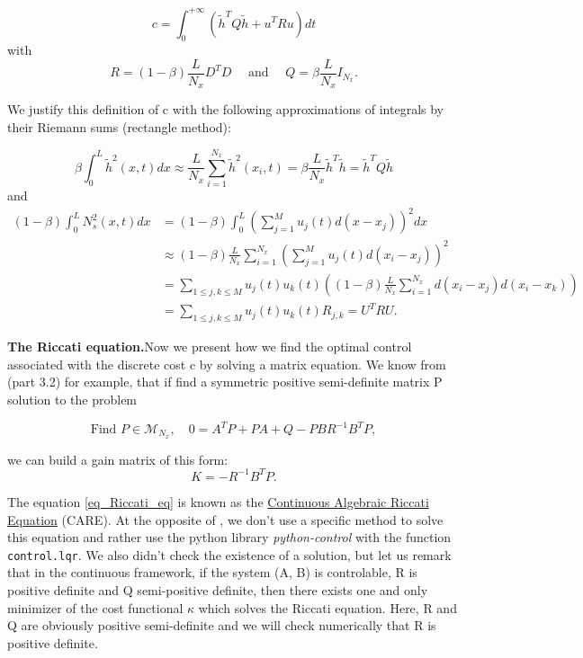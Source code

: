 \documentclass[12pt]{article}
\begin{document}
\begin{equation}\label{eq_LQR_discrete_cost}
\boxed{
    c = \int_0^{+\infty}(\tilde{h}^TQ\tilde{h}+u^TRu)dt}
\end{equation}
with 
\begin{equation}\label{eq_LQR_discrete_cost_matrices}
   R=(1-\beta)\frac{L}{N_x}D^TD\quad \text{ and } \quad  Q=\beta \frac{L}{N_x}I_{N_x}.
\end{equation}

We justify this definition of c with the following approximations of integrals by their Riemann sums (rectangle method):

$$\beta\int_0^L\tilde{h}^2(x,t)dx \boxed{\approx} \frac{L}{N_x}\sum_{i=1}^{N_x}\tilde{h}^2(x_i,t) = \beta\frac{L}{N_x}\tilde{h}^T\tilde{h}=\tilde{h}^TQ\tilde{h}$$
and 
\begin{align*} (1-\beta)\int_0^L N_s^2(x, t)dx &= (1-\beta)\int_0^L(\sum_{j=1}^{M}u_j(t)d(x-x_j))^2dx \\ &\boxed{\approx} (1-\beta)\frac{L}{N_x}\sum_{i=1}^{N_x}(\sum_{j=1}^{M}u_j(t)d(x_i-x_j))^2 \\&= \sum_{1\leq j, k\leq M}u_j(t)u_k(t)((1-\beta)\frac{L}{N_x}\sum_{i=1}^{N_x}d(x_i-x_j)d(x_i-x_k)) \\ &= \sum_{1\leq j, k\leq M}u_j(t)u_k(t) R_{j,k} = U^TRU.\end{align*}



\textbf{The Riccati equation.}Now we present how we find the optimal control associated with the discrete cost c by solving a matrix equation. We know from \cite{A_Thompson_FLF_blowing_suction} (part 3.2) for example, that if find a symmetric positive semi-definite matrix P solution to the problem

\begin{equation}\label{eq_Riccati_eq}
    \text{Find } P\in \mathcal{M}_{N_x}, \quad 0=A^TP+PA+Q-PBR^{-1}B^TP, 
\end{equation}

 we can build a gain matrix of this form:
 \begin{equation}
    K = -R^{-1}B^TP.
 \end{equation}
 
 The equation \eqref{eq_Riccati_eq} is known as the \underline{Continuous Algebraic Riccati Equation} (CARE). At the opposite of \cite{holroyd2023linearquadraticregulationcontrol}, we don't use a specific method to solve this equation and rather use the python library \textit{python-control} with the function \texttt{control.lqr}. We also didn't check the existence of a solution, but let us remark that in the continuous framework, if the system (A, B) is controlable,  R is positive definite and Q semi-positive definite, then there exists one and only minimizer of the cost functional $\kappa$ which solves the Riccati equation. Here, R and Q are obviously positive semi-definite and we will check numerically that R is positive definite. 
\end{document}
